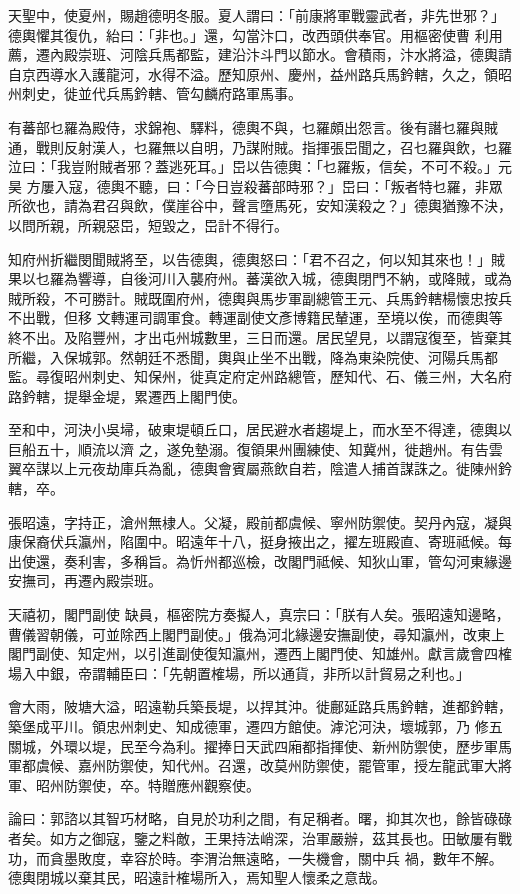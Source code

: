 \begin{pinyinscope}
 天聖中，使夏州，賜趙德明冬服。夏人謂曰：「前康將軍戰靈武者，非先世邪？」德輿懼其復仇，紿曰：「非也。」還，勾當汴口，改西頭供奉官。用樞密使曹
 利用薦，遷內殿崇班、河陰兵馬都監，建沿汴斗門以節水。會積雨，汴水將溢，德輿請自京西導水入護龍河，水得不溢。歷知原州、慶州，益州路兵馬鈐轄，久之，領昭州刺史，徙並代兵馬鈐轄、管勾麟府路軍馬事。



 有蕃部乜羅為殿侍，求錦袍、驛料，德輿不與，乜羅頗出怨言。後有譖乜羅與賊通，戰則反射漢人，乜羅無以自明，乃謀附賊。指揮張岊聞之，召乜羅與飲，乜羅泣曰：「我豈附賊者邪？蓋逃死耳。」岊以告德輿：「乜羅叛，信矣，不可不殺。」元昊
 方屢入寇，德輿不聽，曰：「今日豈殺蕃部時邪？」岊曰：「叛者特乜羅，非眾所欲也，請為君召與飲，僕崖谷中，聲言墮馬死，安知漢殺之？」德輿猶豫不決，以問所親，所親惡岊，短毀之，岊計不得行。



 知府州折繼閔聞賊將至，以告德輿，德輿怒曰：「君不召之，何以知其來也！」賊果以乜羅為響導，自後河川入襲府州。蕃漢欲入城，德輿閉門不納，或降賊，或為賊所殺，不可勝計。賊既圍府州，德輿與馬步軍副總管王元、兵馬鈐轄楊懷忠按兵不出戰，但移
 文轉運司調軍食。轉運副使文彥博籍民輦運，至境以俟，而德輿等終不出。及陷豐州，才出屯州城數里，三日而還。居民望見，以謂寇復至，皆棄其所繼，入保城郭。然朝廷不悉聞，輿與止坐不出戰，降為東染院使、河陽兵馬都監。尋復昭州刺史、知保州，徙真定府定州路總管，歷知代、石、儀三州，大名府路鈐轄，提舉金堤，累遷西上閣門使。



 至和中，河決小吳埽，破東堤頓丘口，居民避水者趨堤上，而水至不得達，德輿以巨船五十，順流以濟
 之，遂免墊溺。復領果州團練使、知冀州，徙趙州。有告雲翼卒謀以上元夜劫庫兵為亂，德輿會賓屬燕飲自若，陰遣人捕首謀誅之。徙陳州鈐轄，卒。



 張昭遠，字持正，滄州無棣人。父凝，殿前都虞候、寧州防禦使。契丹內寇，凝與康保裔伏兵瀛州，陷圍中。昭遠年十八，挺身掖出之，擢左班殿直、寄班祗候。每出使還，奏利害，多稱旨。為忻州都巡檢，改閣門祗候、知狄山軍，管勾河東緣邊安撫司，再遷內殿崇班。



 天禧初，閣門副使
 缺員，樞密院方奏擬人，真宗曰：「朕有人矣。張昭遠知邊略，曹儀習朝儀，可並除西上閣門副使。」俄為河北緣邊安撫副使，尋知瀛州，改東上閣門副使、知定州，以引進副使復知瀛州，遷西上閣門使、知雄州。獻言歲會四榷場入中銀，帝謂輔臣曰：「先朝置榷場，所以通貨，非所以計貿易之利也。」



 會大雨，陂塘大溢，昭遠勒兵築長堤，以捍其沖。徙鄜延路兵馬鈐轄，進都鈐轄，築堡成平川。領忠州刺史、知成德軍，遷四方館使。滹沱河決，壞城郭，乃
 修五關城，外環以堤，民至今為利。擢捧日天武四廂都指揮使、新州防禦使，歷步軍馬軍都虞候、嘉州防禦使，知代州。召還，改莫州防禦使，罷管軍，授左龍武軍大將軍、昭州防禦使，卒。特贈應州觀察使。



 論曰：郭諮以其智巧材略，自見於功利之間，有足稱者。曙，抑其次也，餘皆碌碌者矣。如方之御寇，鑒之料敵，王果持法峭深，治軍嚴辦，茲其長也。田敏屢有戰功，而貪墨敗度，幸容於時。李渭治無遠略，一失機會，關中兵
 禍，數年不解。德輿閉城以棄其民，昭遠計榷場所入，焉知聖人懷柔之意哉。



\end{pinyinscope}